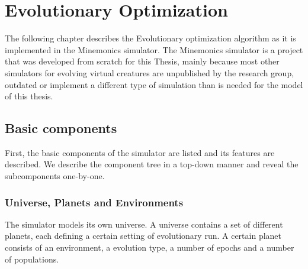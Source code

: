 \documentclass[main]{subfiles}
\begin{document}
\setcounter{chapter}{1}

\chapter{Evolutionary Optimization} %

\label{Chapter\thechapter} %


The following chapter describes the Evolutionary optimization algorithm as it is implemented in the Minemonics simulator. The Minemonics simulator is a project that was developed from scratch for this Thesis, mainly because most other simulators for evolving virtual creatures are unpublished by the research group, outdated or implement a different type of simulation than is needed for the model of this thesis.

\section{Basic components}

First, the basic components of the simulator are listed and its features are described. We describe the component tree in a top-down manner and reveal the subcomponents one-by-one. 

\subsection{Universe, Planets and Environments}

The simulator models its own universe. A universe contains a set of different planets, each defining a certain setting of evolutionary run. A certain planet consists of an environment, a evolution type, a number of epochs and a number of populations. 
\end{document}
